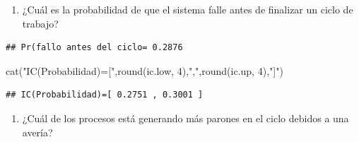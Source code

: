 \documentclass[
]{book}
\newenvironment{Shaded}{\begin{snugshade}}{\end{snugshade}}
\newcommand{\DecValTok}[1]{\textcolor[rgb]{0.00,0.00,0.81}{#1}}
\newcommand{\FloatTok}[1]{\textcolor[rgb]{0.00,0.00,0.81}{#1}}
\newcommand{\FunctionTok}[1]{\textcolor[rgb]{0.00,0.00,0.00}{#1}}
\newcommand{\NormalTok}[1]{#1}
\newcommand{\OtherTok}[1]{\textcolor[rgb]{0.56,0.35,0.01}{#1}}
\newcommand{\SpecialCharTok}[1]{\textcolor[rgb]{0.00,0.00,0.00}{#1}}
\newcommand{\StringTok}[1]{\textcolor[rgb]{0.31,0.60,0.02}{#1}}
\providecommand{\tightlist}{%
  \setlength{\itemsep}{0pt}\setlength{\parskip}{0pt}}
\theoremstyle{definition}
\theoremstyle{definition}
\theoremstyle{definition}
\theoremstyle{definition}
\theoremstyle{remark}
\begin{document}
\begin{enumerate}
\def\labelenumi{\arabic{enumi}.}
\tightlist
\item
  ¿Cuál es la probabilidad de que el sistema falle antes de finalizar un ciclo de trabajo?
\end{enumerate}

\begin{Shaded}
\end{Shaded}

\begin{verbatim}
## Pr(fallo antes del ciclo= 0.2876
\end{verbatim}

\begin{Shaded}
\begin{Highlighting}[]
\FunctionTok{cat}\NormalTok{(}\StringTok{"IC(Probabilidad)=["}\NormalTok{,}\FunctionTok{round}\NormalTok{(ic.low, }\DecValTok{4}\NormalTok{),}\StringTok{","}\NormalTok{,}\FunctionTok{round}\NormalTok{(ic.up, }\DecValTok{4}\NormalTok{),}\StringTok{"]"}\NormalTok{)}
\end{Highlighting}
\end{Shaded}

\begin{verbatim}
## IC(Probabilidad)=[ 0.2751 , 0.3001 ]
\end{verbatim}

\begin{enumerate}
\def\labelenumi{\arabic{enumi}.}
\setcounter{enumi}{1}
\tightlist
\item
  ¿Cuál de los procesos está generando más parones en el ciclo debidos a una avería?
\end{enumerate}
\end{document}
